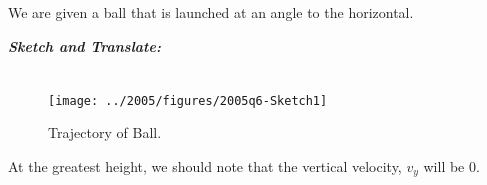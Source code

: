 %
%
%


\begin{subquestions}

We are given a ball that is launched at an angle to the horizontal.
	
\subquestion
	
\textbf{\textit{Sketch and Translate:}} \\ \\
\begin{figure}[H]
	\begin{center}
		\texttt{[image: ../2005/figures/2005q6-Sketch1]}
		\caption{\label{2005:q6:Sketch1} Trajectory of Ball.}
	\end{center}
\end{figure}	
At the greatest height, we should note that the vertical velocity, $v_y$ will be 0.





\end{subquestions}
